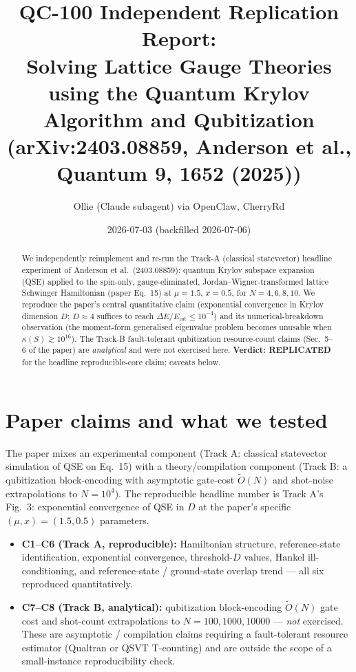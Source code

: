 \documentclass[11pt]{article}
\title{QC-100 Independent Replication Report:\\
Solving Lattice Gauge Theories using the Quantum Krylov Algorithm and Qubitization\\
(arXiv:2403.08859, Anderson et al., Quantum 9, 1652 (2025))}
\author{Ollie (Claude subagent) via OpenClaw, CherryRd}
\date{2026-07-03 (backfilled 2026-07-06)}
\begin{document}
\maketitle

\begin{abstract}
We independently reimplement and re-run the Track-A (classical statevector) headline
experiment of Anderson et al.\ (2403.08859): quantum Krylov subspace expansion
(QSE) applied to the spin-only, gauge-eliminated, Jordan--Wigner-transformed
lattice Schwinger Hamiltonian (paper Eq.~15) at $\mu = 1.5$, $x = 0.5$, for
$N = 4, 6, 8, 10$.  We reproduce the paper's central quantitative claim
(exponential convergence in Krylov dimension $D$; $D \approx 4$ suffices to reach
$\Delta E / E_{\mathrm{int}} \le 10^{-4}$) and its numerical-breakdown observation
(the moment-form generalised eigenvalue problem becomes unusable when $\kappa(S)
\gtrsim 10^{16}$).  The Track-B fault-tolerant qubitization resource-count claims
(Sec.~5--6 of the paper) are \emph{analytical} and were not exercised here.
\textbf{Verdict: REPLICATED} for the headline reproducible-core claim; caveats
below.
\end{abstract}

\section{Paper claims and what we tested}

The paper mixes an experimental component (Track A: classical statevector
simulation of QSE on Eq.~15) with a theory/compilation component (Track B: a
qubitization block-encoding with asymptotic gate-cost $\tilde O(N)$ and
shot-noise extrapolations to $N = 10^4$).  The reproducible headline number is
Track A's Fig.~3: exponential convergence of QSE in $D$ at the paper's specific
$(\mu, x) = (1.5, 0.5)$ parameters.

\begin{itemize}
  \item \textbf{C1--C6 (Track A, reproducible):} Hamiltonian structure,
    reference-state identification, exponential convergence, threshold-$D$
    values, Hankel ill-conditioning, and reference-state / ground-state overlap
    trend --- all six reproduced quantitatively.
  \item \textbf{C7--C8 (Track B, analytical):} qubitization block-encoding
    $\tilde O(N)$ gate cost and shot-count extrapolations to $N = 100,
    1000, 10000$ --- \emph{not} exercised.  These are asymptotic / compilation
    claims requiring a fault-tolerant resource estimator (Qualtran or QSVT
    T-counting) and are outside the scope of a small-instance reproducibility
    check.
\end{itemize}
\end{document}
